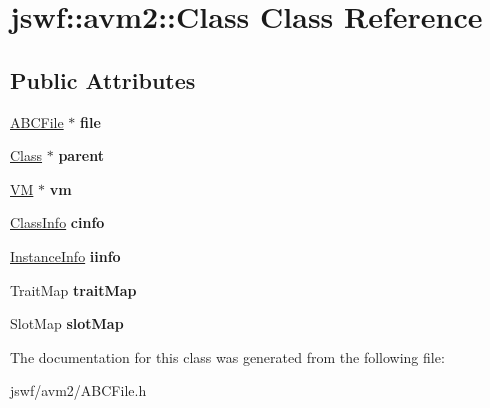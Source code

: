 \hypertarget{classjswf_1_1avm2_1_1_class}{\section{jswf\+:\+:avm2\+:\+:Class Class Reference}
\label{classjswf_1_1avm2_1_1_class}
}
\subsection*{Public Attributes}
\begin{DoxyCompactItemize}
\item 
\hypertarget{classjswf_1_1avm2_1_1_class_ae69515cce4632999d54a061aa1830a15}{\hyperlink{classjswf_1_1avm2_1_1_a_b_c_file}{A\+B\+C\+File} $\ast$ {\bfseries file}}\label{classjswf_1_1avm2_1_1_class_ae69515cce4632999d54a061aa1830a15}

\item 
\hypertarget{classjswf_1_1avm2_1_1_class_aa3351c4c1697cc2865094e45945cd26a}{\hyperlink{classjswf_1_1avm2_1_1_class}{Class} $\ast$ {\bfseries parent}}\label{classjswf_1_1avm2_1_1_class_aa3351c4c1697cc2865094e45945cd26a}

\item 
\hypertarget{classjswf_1_1avm2_1_1_class_ad083ce63da0ee72ab927bdb9584b4c51}{\hyperlink{classjswf_1_1avm2_1_1_v_m}{V\+M} $\ast$ {\bfseries vm}}\label{classjswf_1_1avm2_1_1_class_ad083ce63da0ee72ab927bdb9584b4c51}

\item 
\hypertarget{classjswf_1_1avm2_1_1_class_a2934c683c21c7178b0ee020b3f714f73}{\hyperlink{structjswf_1_1avm2_1_1_class_info}{Class\+Info} {\bfseries cinfo}}\label{classjswf_1_1avm2_1_1_class_a2934c683c21c7178b0ee020b3f714f73}

\item 
\hypertarget{classjswf_1_1avm2_1_1_class_ad4c29064adffcceb8a845babf3adfc22}{\hyperlink{structjswf_1_1avm2_1_1_instance_info}{Instance\+Info} {\bfseries iinfo}}\label{classjswf_1_1avm2_1_1_class_ad4c29064adffcceb8a845babf3adfc22}

\item 
\hypertarget{classjswf_1_1avm2_1_1_class_af87bce2a4540cc8ab8cdc8e04816ef02}{Trait\+Map {\bfseries trait\+Map}}\label{classjswf_1_1avm2_1_1_class_af87bce2a4540cc8ab8cdc8e04816ef02}

\item 
\hypertarget{classjswf_1_1avm2_1_1_class_a3fb41570194ccecc2b325fff07f2a4ff}{Slot\+Map {\bfseries slot\+Map}}\label{classjswf_1_1avm2_1_1_class_a3fb41570194ccecc2b325fff07f2a4ff}

\end{DoxyCompactItemize}


The documentation for this class was generated from the following file\+:\begin{DoxyCompactItemize}
\item 
jswf/avm2/A\+B\+C\+File.\+h\end{DoxyCompactItemize}
